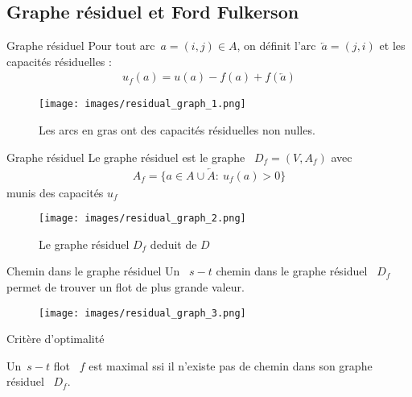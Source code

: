 \documentclass{beamer}
\begin{document}
\subsection{Graphe résiduel et Ford Fulkerson}
\begin{frame}[t]{Graphe résiduel}
  Pour tout arc~$a = (i, j) \in A$, on définit l'arc~$\overleftarrow{a} = (j, i)$  \pause et les capacités résiduelles :
  \begin{align*}
    u_f(a) = u(a) - f(a) +f\left(\overleftarrow{a}\right)
  \end{align*}

  \vfill \pause
  
  \begin{figure}
    \centering
    \texttt{[image: images/residual\_graph\_1.png]}
    \caption{Les arcs en gras ont des capacités résiduelles non nulles.}
  \end{figure}
\end{frame}

\begin{frame}[t]{Graphe résiduel}
  Le graphe résiduel est le graphe ~$D_f = (V, A_f)$ avec
  \begin{align*}
    A_f = \{a \in A \cup \overleftarrow{A}:~ u_f(a) > 0\} 
  \end{align*}
  munis des capacités $u_f$
  
  \vfill \pause
  
  \begin{figure}
    \centering
    \texttt{[image: images/residual\_graph\_2.png]}
    \caption{Le graphe résiduel $D_f$ deduit de $D$}
  \end{figure}
\end{frame}

\begin{frame}[t]{Chemin dans le graphe résiduel}
  Un ~$s-t$ chemin dans le graphe résiduel ~$D_f$ permet de trouver un flot de plus grande valeur.
  
  \vfill \pause
  
  \begin{figure}
    \centering
    \texttt{[image: images/residual\_graph\_3.png]}
  \end{figure}
\end{frame}

\begin{frame}[t]{Critère d'optimalité} \pause
  \begin{theorem}[6.4]
    Un~$s-t$ flot ~$f$ est maximal ssi il n'existe pas de chemin dans son graphe résiduel ~$D_f$. 
  \end{theorem}
\end{frame}
\end{document}
